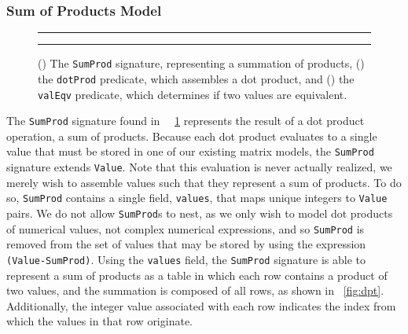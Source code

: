 \subsubsection{Sum of Products Model}
\label{sec:sumprod}

\begin{figure}
\begin{subfigure}[b]{0.5\textwidth}
  \centering
  
  \caption{}
  \label{alloy:sumprod}
\end{subfigure}
{\color{lightgray}\rule{0.4\textwidth}{0.1pt}}
\par\bigskip
\begin{subfigure}[b]{0.5\textwidth}
  \centering
  
  \caption{}
  \label{alloy:dotprod}
\end{subfigure}
{\color{lightgray}\rule{0.4\textwidth}{0.1pt}}
\par\bigskip
\begin{subfigure}[b]{0.5\textwidth}
  \centering
  
  \caption{}
  \label{alloy:valeqv}
\end{subfigure}
\caption{() The \texttt{SumProd} signature, representing a summation of products, () the \texttt{dotProd} predicate, which assembles a dot product, and () the \texttt{valEqv} predicate, which determines if two values are equivalent.}
\end{figure}

The \texttt{SumProd} signature found in ~\figurename~\ref{alloy:sumprod} represents the result of a dot product operation, a sum of products.  Because each dot product evaluates to a single value that must be stored in one of our existing matrix models, the \texttt{SumProd} signature extends \texttt{Value}.  Note that this evaluation is never actually realized, we merely wish to assemble values such that they represent a sum of products.  To do so, \texttt{SumProd} contains a single field, \texttt{values}, that maps unique integers to \texttt{Value} pairs.  We do not allow \texttt{SumProd}s to nest, as we only wish to model dot products of numerical values, not complex numerical expressions, and so \texttt{SumProd} is removed from the set of values that may be stored by using the expression \texttt{(Value-SumProd)}.  Using the \texttt{values} field, the \texttt{SumProd} signature is able to represent a sum of products as a table in which each row contains a product of two values, and the summation is composed of all rows, as shown in \figurename~\ref{fig:dpt}.  Additionally, the integer value associated with each row indicates the index from which the values in that row originate.

